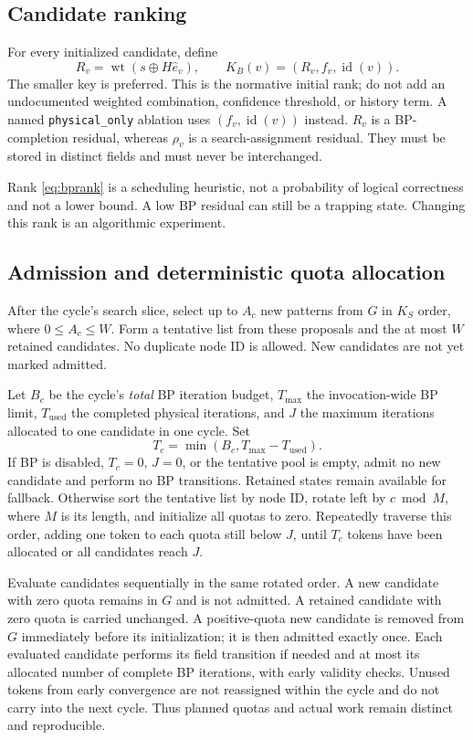 \documentclass[11pt,a4paper]{article}
\newcommand{\wt}{\operatorname{wt}}
\newcommand{\id}{\operatorname{id}}
\newcommand{\code}[1]{\nolinkurl{#1}}
\begin{document}
\subsection{Candidate ranking}
For every initialized candidate, define
\begin{equation}\label{eq:bprank}
 R_v=\wt(s\oplus H\hat e_v),\qquad
 K_B(v)=(R_v,f_v,\id(v)).
\end{equation}
The smaller key is preferred. This is the normative initial rank; do not add an undocumented weighted combination, confidence threshold, or history term. A named \code{physical_only} ablation uses $(f_v,\id(v))$ instead. $R_v$ is a BP-completion residual, whereas $\rho_v$ is a search-assignment residual. They must be stored in distinct fields and must never be interchanged.

Rank \eqref{eq:bprank} is a scheduling heuristic, not a probability of logical correctness and not a lower bound. A low BP residual can still be a trapping state. Changing this rank is an algorithmic experiment.

\subsection{Admission and deterministic quota allocation}
After the cycle's search slice, select up to $A_c$ new patterns from $G$ in $K_S$ order, where $0\leq A_c\leq W$. Form a tentative list from these proposals and the at most $W$ retained candidates. No duplicate node ID is allowed. New candidates are not yet marked admitted.

Let $B_c$ be the cycle's \emph{total} BP iteration budget, $T_{\max}$ the invocation-wide BP limit, $T_{\mathrm{used}}$ the completed physical iterations, and $J$ the maximum iterations allocated to one candidate in one cycle. Set
\begin{equation}
 T_c=\min(B_c,T_{\max}-T_{\mathrm{used}}).
\end{equation}
If BP is disabled, $T_c=0$, $J=0$, or the tentative pool is empty, admit no new candidate and perform no BP transitions. Retained states remain available for fallback. Otherwise sort the tentative list by node ID, rotate left by $c\bmod M$, where $M$ is its length, and initialize all quotas to zero. Repeatedly traverse this order, adding one token to each quota still below $J$, until $T_c$ tokens have been allocated or all candidates reach $J$.

Evaluate candidates sequentially in the same rotated order. A new candidate with zero quota remains in $G$ and is not admitted. A retained candidate with zero quota is carried unchanged. A positive-quota new candidate is removed from $G$ immediately before its initialization; it is then admitted exactly once. Each evaluated candidate performs its field transition if needed and at most its allocated number of complete BP iterations, with early validity checks. Unused tokens from early convergence are not reassigned within the cycle and do not carry into the next cycle. Thus planned quotas and actual work remain distinct and reproducible.
\end{document}
